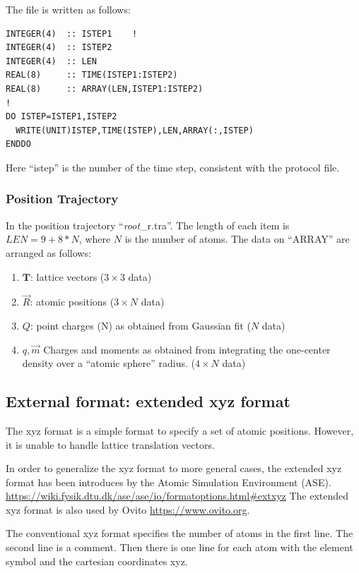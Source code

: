 \documentclass[final,12pt,makeidx,DIV=calc]{article}
\begin{document}
{{{{{{The file is written as follows:
\begin{verbatim}
INTEGER(4)  :: ISTEP1    !
INTEGER(4)  :: ISTEP2
INTEGER(4)  :: LEN
REAL(8)     :: TIME(ISTEP1:ISTEP2)
REAL(8)     :: ARRAY(LEN,ISTEP1:ISTEP2)
!
DO ISTEP=ISTEP1,ISTEP2
  WRITE(UNIT)ISTEP,TIME(ISTEP),LEN,ARRAY(:,ISTEP)
ENDDO
\end{verbatim}

Here ``istep'' is the number of the time step, consistent with the
protocol file. 

\subsubsection{Position Trajectory}
In the position trajectory ``{\it root}\_r.tra''. The length of each
item is $LEN=9+8*N$, where $N$ is the number of atoms. The data on
``ARRAY'' are arranged as follows:
\begin{enumerate}
\item $\mathbf{T}$: lattice vectors ($3\times3$ data)
\item $\vec{R}$: atomic positions ($3\times N$ data)
\item $Q$: point charges (N) as obtained from Gaussian fit ($N$ data)
\item $q,\vec{m}$ Charges and moments as obtained from integrating the
  one-center density over a ``atomic sphere'' radius. ($4\times N$ data)
\end{enumerate}


\subsection{External format: extended xyz format}
The xyz format is a simple format to specify a set of atomic
positions. However, it is unable to handle lattice translation
vectors.

In order to generalize the xyz format to more general cases, the
extended xyz format has been introduces by the Atomic Simulation
Environment
(ASE). \url{https://wiki.fysik.dtu.dk/ase/ase/io/formatoptions.html#extxyz}
The extended xyz format is also used by Ovito
\url{https://www.ovito.org}.

The conventional xyz format specifies the number of atoms in the first
line. The second line is a comment. Then there is one line for each
atom with the element symbol and the cartesian coordinates xyz.


}}}}}}
\end{document}

